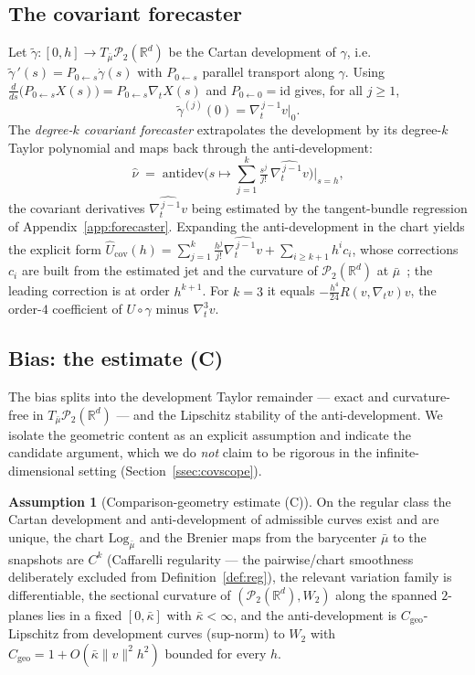 \documentclass[11pt]{article}
\theoremstyle{definition}
\newtheorem{assumption}{Assumption}
\theoremstyle{remark}
\newcommand{\R}{\mathbb{R}}
\newcommand{\PP}{\mathcal{P}_2(\R^d)}
\begin{document}
\subsection{The covariant forecaster}\label{ssec:covdef}
Let $\widetilde\gamma:[0,h]\to T_{\bar\mu}\PP$ be the Cartan development of $\gamma$, i.e.\
$\widetilde\gamma\,'(s)=P_{0\leftarrow s}\dot\gamma(s)$ with $P_{0\leftarrow s}$ parallel transport
along $\gamma$. Using $\tfrac{d}{ds}\big(P_{0\leftarrow s}X(s)\big)=P_{0\leftarrow s}\nabla_t X(s)$ and
$P_{0\leftarrow0}=\mathrm{id}$ gives, for all $j\ge1$,
\begin{equation}\label{eq:devjet}
   \widetilde\gamma^{(j)}(0)=\nabla_t^{\,j-1}v\big|_{0}.
\end{equation}
The \emph{degree-$k$ covariant forecaster} extrapolates the development by its degree-$k$ Taylor
polynomial and maps back through the anti-development:
\[
   \widehat\nu \;=\; \mathrm{antidev}\!\Big(s\mapsto\textstyle\sum_{j=1}^{k}\tfrac{s^{j}}{j!}\,
   \widehat{\nabla_t^{\,j-1}v}\Big)\Big|_{s=h},
\]
the covariant derivatives $\widehat{\nabla_t^{\,j-1}v}$ being estimated by the tangent-bundle
regression of Appendix~\ref{app:forecaster}. Expanding the anti-development in the chart yields the
explicit form
$\widehat U_{\mathrm{cov}}(h)=\sum_{j=1}^{k}\tfrac{h^{j}}{j!}\widehat{\nabla_t^{\,j-1}v}
+\sum_{i\ge k+1}h^{i}c_i$, whose corrections $c_i$ are built from the estimated jet and the
curvature of $\PP$ at $\bar\mu$~\cite{gigli}; the leading correction is at order $h^{k+1}$. For
$k=3$ it equals $-\tfrac{h^{4}}{24}R(v,\nabla_t v)v$, the order-$4$ coefficient of $U\circ\gamma$
minus $\nabla_t^{3}v$.

\subsection{Bias: the estimate (C)}\label{ssec:covbias}
The bias splits into the development Taylor remainder --- exact and curvature-free in
$T_{\bar\mu}\PP$ --- and the Lipschitz stability of the anti-development. We isolate the geometric
content as an explicit assumption and indicate the candidate argument, which we do \emph{not} claim
to be rigorous in the infinite-dimensional setting (Section~\ref{ssec:covscope}).

\begin{assumption}[Comparison-geometry estimate (C)]\label{ass:C}
On the regular class the Cartan development and anti-development of admissible curves exist and are
unique, the chart $\mathrm{Log}_{\bar\mu}$ and the Brenier maps from the barycenter $\bar\mu$ to the
snapshots are $C^k$ (Caffarelli regularity --- the pairwise/chart smoothness deliberately excluded
from Definition~\ref{def:reg}), the relevant variation family is differentiable, the sectional
curvature of $(\PP,W_2)$ along the spanned $2$-planes lies in a fixed $[0,\bar\kappa]$ with
$\bar\kappa<\infty$, and the anti-development is $C_{\mathrm{geo}}$-Lipschitz from development curves
(sup-norm) to $W_2$ with $C_{\mathrm{geo}}=1+O(\bar\kappa\|v\|^2h^2)$ bounded for every $h$.
\end{assumption}
\end{document}
